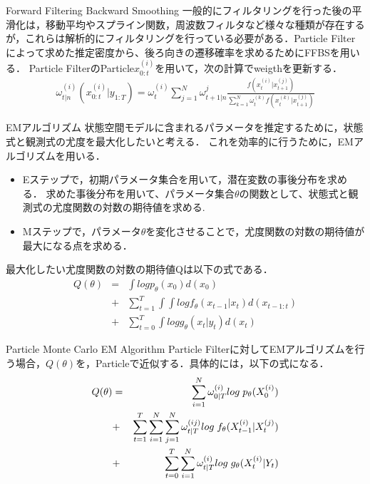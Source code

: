 \documentclass[dvipdfmx]{beamer}
\newcommand{\backupbegin}{
\newcounter{framenumberappendix}
\setcounter{framenumberappendix}{\value{framenumber}}
}
\newcommand{\backupend}{
\addtocounter{framenumberappendix}{-\value{framenumber}}
\addtocounter{framenumber}{\value{framenumberappendix}}
}
\begin{document}
\begin{frame}{Forward Filtering Backward Smoothing}
一般的にフィルタリングを行った後の平滑化は，移動平均やスプライン関数，周波数フィルタなど様々な種類が存在するが，これらは解析的にフィルタリングを行っている必要がある．Particle Filterによって求めた推定密度から、後ろ向きの遷移確率を求めるためにFFBSを用いる．
Particle FilterのParticle${x}^{(i)}_{0:t}$を用いて，次の計算でweigthを更新する．
\begin{eqnarray*}
\omega_{t|n}^{(i)}(x_{0:t}^{(i)}|y_{1:T})=\omega_{t}^{(i)}\sum_{j=1}^N\omega_{t+1|n}^j\frac{f(x_t^{(i)}|x_{t+1}^{(j)})}{\sum_{k=1}^{N}\omega_t^{(k)}f(x_t^{(k)}|x_{t+1}^{(j)})}
\end{eqnarray*}
\end{frame}

\begin{frame}{EMアルゴリズム}
状態空間モデルに含まれるパラメータを推定するために，状態式と観測式の尤度を最大化したいと考える．
これを効率的に行うために，EMアルゴリズムを用いる．
\begin{itemize}
\item Eステップで，初期パラメータ集合を用いて，潜在変数の事後分布を求める．
求めた事後分布を用いて、パラメータ集合$\theta$の関数として、状態式と観測式の尤度関数の対数の期待値を求める.
\item Mステップで，パラメータ$\theta$を変化させることで，尤度関数の対数の期待値が最大になる点を求める．
\end{itemize}
最大化したい尤度関数の対数の期待値Qは以下の式である．
\begin{eqnarray*}
Q(\theta)&=&\int log p_{\theta}(x_0)d(x_0)\\
&+&\sum_{t=1}^T \int\int log f_{\theta}(x_{t-1}|x_{t})d(x_{t-1:t})\\
&+&\sum_{t=0}^T\int log g_{\theta}(x_t|y_t) d(x_t)
\end{eqnarray*}
\end{frame}

\begin{frame}{Particle Monte Carlo EM Algorithm}
Particle Filterに対してEMアルゴリズムを行う場合，$Q(\theta)$を，Particleで近似する．具体的には，以下の式になる．
\begin{eqnarray*}
Q(\theta)&=&\sum_{i=1}^N \omega_{0|T}^{(i)} log\hspace{1mm} p_{\theta}(X_0^{(i)})\\
&+&\sum_{t=1}^T \sum_{i=1}^N\sum_{j=1}^N \omega_{t|T}^{(ij)} log\hspace{1mm} f_{\theta}(X_{t-1}^{(i)}|X_{t}^{(j)})\\
&+&\sum_{t=0}^T \sum_{i=1}^N \omega_{t|T}^{(i)} log\hspace{1mm} g_{\theta}(X_t^{(i)}|Y_t) 
\end{eqnarray*}
\end{frame}


\appendix
\backupbegin




\backupend
\end{document}

